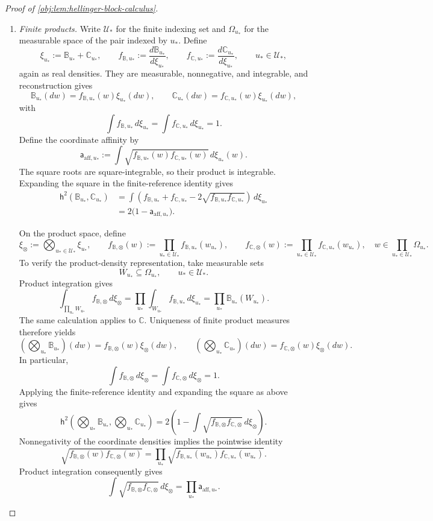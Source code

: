 \documentclass[11pt]{article}
\begin{document}
\begin{proof}[Proof of \cref{obj:lem:hellinger-block-calculus}]
\begin{enumerate}
\item \emph{Finite products.}
Write \(\mathcal U_*\) for the finite indexing set and \(\Omega_{u_*}\) for the measurable space of the pair indexed by \(u_*\). Define
\[
\xi_{u_*}:=\mathbb B_{u_*}+\mathbb C_{u_*},
\qquad
f_{\mathbb B,u_*}:=\frac{d\mathbb B_{u_*}}{d\xi_{u_*}},
\qquad
f_{\mathbb C,u_*}:=\frac{d\mathbb C_{u_*}}{d\xi_{u_*}},
\qquad u_*\in\mathcal U_*,
\]
again as real densities. They are measurable, nonnegative, and integrable, and reconstruction gives
\[
\mathbb B_{u_*}(dw)
   =f_{\mathbb B,u_*}(w)\xi_{u_*}(dw),
\qquad
\mathbb C_{u_*}(dw)
   =f_{\mathbb C,u_*}(w)\xi_{u_*}(dw),
\]
with
\[
\int f_{\mathbb B,u_*}\,d\xi_{u_*}
=
\int f_{\mathbb C,u_*}\,d\xi_{u_*}
=1.
\]
Define the coordinate affinity by
\[
\mathsf a_{\mathrm{aff},u_*}
:=
\int
\sqrt{f_{\mathbb B,u_*}(w)f_{\mathbb C,u_*}(w)}
\,d\xi_{u_*}(w).
\]
The square roots are square-integrable, so their product is integrable. Expanding the square in the finite-reference identity gives
\[
\begin{aligned}
\mathsf h^2(\mathbb B_{u_*},\mathbb C_{u_*})
&=\int
 \left(
 f_{\mathbb B,u_*}+f_{\mathbb C,u_*}
 -2\sqrt{f_{\mathbb B,u_*}f_{\mathbb C,u_*}}
 \right)\,d\xi_{u_*}\\
&=2\bigl(1-\mathsf a_{\mathrm{aff},u_*}\bigr).
\end{aligned}
\]

On the product space, define
\[
\xi_{\otimes}:=\bigotimes_{u_*\in\mathcal U_*}\xi_{u_*},
\qquad
f_{\mathbb B,\otimes}(w)
   :=\prod_{u_*\in\mathcal U_*}f_{\mathbb B,u_*}(w_{u_*}),
\qquad
f_{\mathbb C,\otimes}(w)
   :=\prod_{u_*\in\mathcal U_*}f_{\mathbb C,u_*}(w_{u_*}),
\quad
w\in\prod_{u_*\in\mathcal U_*}\Omega_{u_*}.
\]
To verify the product-density representation, take measurable sets
\[
W_{u_*}\subseteq\Omega_{u_*},
\qquad u_*\in\mathcal U_*.
\]
Product integration gives
\[
\int_{\prod_{u_*}W_{u_*}}
 f_{\mathbb B,\otimes}\,d\xi_{\otimes}
=
\prod_{u_*}
 \int_{W_{u_*}}f_{\mathbb B,u_*}\,d\xi_{u_*}
=
\prod_{u_*}\mathbb B_{u_*}(W_{u_*}).
\]
The same calculation applies to \(\mathbb C\). Uniqueness of finite product measures therefore yields
\[
\left(\bigotimes_{u_*}\mathbb B_{u_*}\right)(dw)
   =f_{\mathbb B,\otimes}(w)\xi_{\otimes}(dw),
\qquad
\left(\bigotimes_{u_*}\mathbb C_{u_*}\right)(dw)
   =f_{\mathbb C,\otimes}(w)\xi_{\otimes}(dw).
\]
In particular,
\[
\int f_{\mathbb B,\otimes}\,d\xi_{\otimes}
=
\int f_{\mathbb C,\otimes}\,d\xi_{\otimes}
=1.
\]
Applying the finite-reference identity and expanding the square as above gives
\[
\mathsf h^2\left(\bigotimes_{u_*}\mathbb B_{u_*},
                \bigotimes_{u_*}\mathbb C_{u_*}\right)
=
2\left(
1-\int\sqrt{f_{\mathbb B,\otimes}f_{\mathbb C,\otimes}}
\,d\xi_{\otimes}
\right).
\]
Nonnegativity of the coordinate densities implies the pointwise identity
\[
\sqrt{f_{\mathbb B,\otimes}(w)f_{\mathbb C,\otimes}(w)}
=
\prod_{u_*}
\sqrt{f_{\mathbb B,u_*}(w_{u_*})
      f_{\mathbb C,u_*}(w_{u_*})}.
\]
Product integration consequently gives
\[
\int\sqrt{f_{\mathbb B,\otimes}f_{\mathbb C,\otimes}}
\,d\xi_{\otimes}
=
\prod_{u_*}\mathsf a_{\mathrm{aff},u_*}.
\]


\end{enumerate}
\end{proof}
\end{document}
